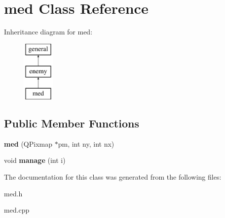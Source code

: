 \hypertarget{classmed}{\section{med \-Class \-Reference}
\label{classmed}
}
\-Inheritance diagram for med\-:\begin{figure}[H]
\begin{center}
\leavevmode
\includegraphics[height=3.000000cm]{classmed}
\end{center}
\end{figure}
\subsection*{\-Public \-Member \-Functions}
\begin{DoxyCompactItemize}
\item 
\hypertarget{classmed_a6d46dbef55a99ced58d432bd525a6893}{{\bfseries med} (\-Q\-Pixmap $\ast$pm, int ny, int nx)}\label{classmed_a6d46dbef55a99ced58d432bd525a6893}

\item 
\hypertarget{classmed_ab54619b6100c138944028f7aebfb0a7c}{void {\bfseries manage} (int i)}\label{classmed_ab54619b6100c138944028f7aebfb0a7c}

\end{DoxyCompactItemize}


\-The documentation for this class was generated from the following files\-:\begin{DoxyCompactItemize}
\item 
med.\-h\item 
med.\-cpp\end{DoxyCompactItemize}
